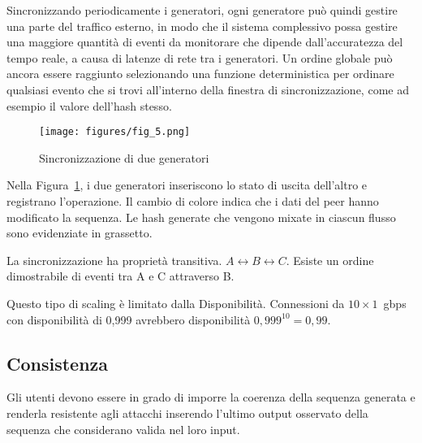 \documentclass[12pt]{article}
\begin{document}
Sincronizzando periodicamente i generatori, ogni generatore può quindi gestire una parte del traffico esterno, in modo che il sistema complessivo possa gestire una maggiore quantità di eventi da monitorare che dipende dall'accuratezza del tempo reale, a causa di latenze di rete tra i generatori. Un ordine globale può ancora essere raggiunto selezionando una funzione deterministica per ordinare qualsiasi evento che si trovi all'interno della finestra di sincronizzazione, come ad esempio il valore dell'hash stesso.


\begin{figure}
  \begin{center}
    \centering
    \texttt{[image: figures/fig\_5.png]}
    \caption[Fig 5]{Sincronizzazione di due generatori\label{fig:poh_scale}}
  \end{center}
  \end{figure}

Nella Figura~\ref{fig:poh_scale}, i due generatori inseriscono lo stato di uscita dell'altro e registrano l'operazione. Il cambio di colore indica che i dati del peer hanno modificato la sequenza.  Le hash generate che vengono mixate in ciascun flusso sono evidenziate in grassetto. 

La sincronizzazione ha proprietà transitiva. \(A \leftrightarrow B \leftrightarrow C\). Esiste un ordine dimostrabile di eventi tra A e C attraverso B.

Questo tipo di scaling è limitato dalla Disponibilità. Connessioni da $10 \times 1$~gbps con disponibilità di 0,999 avrebbero disponibilità \(0,999^{10} = 0,99 \).

\subsection{Consistenza}
Gli utenti devono essere in grado di imporre la coerenza della sequenza generata e renderla resistente agli attacchi inserendo l'ultimo output osservato della sequenza che considerano valida nel loro input.\\
\end{document}
